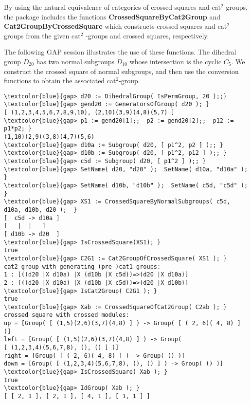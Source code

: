 \documentclass[a4paper,11pt]{article}
\theoremstyle{plain}
\theoremstyle{definition}
\begin{document}
By using the natural equivalence of categories of crossed squares and cat$%
^{2}$-groups, the package includes the functions \textbf{%
	CrossedSquareByCat2Group} and \textbf{Cat2GroupByCrossedSquare} which
constructs crossed squares and cat$^{2}$-groups from the given cat$^{2}$%
-groups and crossed squares, respectively.

The following \textsf{GAP} session illustrates the use of these functions.
The dihedral group $D_{20}$ has two normal subgroups $D_{10}$ 
whose intersection is the cyclic $C_5$.  
We construct the crossed square of normal subgroups, 
and then use the conversion functions to obtain the associated cat$^{2}$-group.

\begin{Verbatim}[frame=single, fontsize=\small, commandchars=\\\{\}]
\textcolor{blue}{gap> d20 := DihedralGroup( IsPermGroup, 20 );;}
\textcolor{blue}{gap> gend20 := GeneratorsOfGroup( d20 ); }
[ (1,2,3,4,5,6,7,8,9,10), (2,10)(3,9)(4,8)(5,7) ]
\textcolor{blue}{gap> p1 := gend20[1];;  p2 := gend20[2];;  p12 := p1*p2; }
(1,10)(2,9)(3,8)(4,7)(5,6)
\textcolor{blue}{gap> d10a := Subgroup( d20, [ p1^2, p2 ] );; }
\textcolor{blue}{gap> d10b := Subgroup( d20, [ p1^2, p12 ] );; }
\textcolor{blue}{gap> c5d := Subgroup( d20, [ p1^2 ] );; }
\textcolor{blue}{gap> SetName( d20, "d20" );  SetName( d10a, "d10a" ); }
\textcolor{blue}{gap> SetName( d10b, "d10b" );  SetName( c5d, "c5d" );  }
\textcolor{blue}{gap> XS1 := CrossedSquareByNormalSubgroups( c5d, d10a, d10b, d20 );  }
[  c5d -> d10a ]
[   |  |   ]
[ d10b -> d20  ]
\textcolor{blue}{gap> IsCrossedSquare(XS1); }
true
\textcolor{blue}{gap> C2G1 := Cat2GroupOfCrossedSquare( XS1 ); }
cat2-group with generating (pre-)cat1-groups:
1 : [((d20 |X d10a) |X (d10b |X c5d))=>(d20 |X d10a)]
2 : [((d20 |X d10a) |X (d10b |X c5d))=>(d20 |X d10b)]
\textcolor{blue}{gap> IsCat2Group( C2G1 ); }
true
\textcolor{blue}{gap> Xab := CrossedSquareOfCat2Group( C2ab ); }
crossed square with crossed modules:
up = [Group( [ (1,5)(2,6)(3,7)(4,8) ] ) -> Group( [ ( 2, 6)( 4, 8) ] )]
left = [Group( [ (1,5)(2,6)(3,7)(4,8) ] ) -> Group(
[ (1,2,3,4)(5,6,7,8), (), () ] )]
right = [Group( [ ( 2, 6)( 4, 8) ] ) -> Group( () )]
down = [Group( [ (1,2,3,4)(5,6,7,8), (), () ] ) -> Group( () )]
\textcolor{blue}{gap> IsCrossedSquare( Xab ); }
true
\textcolor{blue}{gap> IdGroup( Xab ); }
[ [ 2, 1 ], [ 2, 1 ], [ 4, 1 ], [ 1, 1 ] ]
\end{Verbatim}


\end{document}
